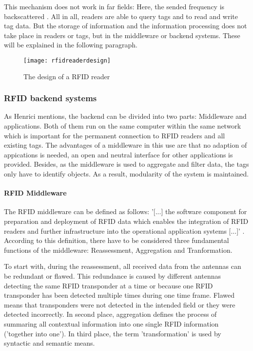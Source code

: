 This mechanism does not work in far fields: Here, the sended frequency is backscattered \cite{henrici}.
All in all, readers are able to query tags and to read and write tag data. But the storage of information and the information processing does not take place in readers or tags, but in the middleware or backend systems. These will be explained in the following paragraph.

\begin{figure}
\centering
\texttt{[image: rfidreaderdesign]} 
\caption{\label{fig:readerdesign}The design of a RFID reader \cite[p.17]{chipless}} 
\end{figure}

\subsubsection{RFID backend systems} \label{backend}

As Henrici \cite{henrici} mentions, the backend can be divided into two parts: Middleware and applications. Both of them run on the same computer within the same network which is important for the permanent connection to RFID readers and all existing tags. The advantages of a middleware in this use are that no adaption of appications is needed, an open and neutral interface for other applications is provided. Besides, as the middleware is used to aggregate and filter data, the tags only have to identify objects. As a result, modularity of the system is maintained.

\paragraph{RFID Middleware}

The RFID middleware can be defined as follows: '[...] the software component for preparation and deployment of RFID data which enables the integration of RFID readers and further infrastructure into the operational application systems [...]' \cite[p.20 ff.]{fokus}. According to this definition, there have to be considered three fundamental functions of the middleware: Reassessment, Aggregation and Tranformation. 

To start with, during the reassessment, all received data from the antennas can be redundant or flawed. This redundance is caused by different antennas detecting the same RFID transponder at a time or because one RFID transponder has been detected multiple times during one time frame. Flawed means that transponders were not detected in the intended field or they were detected incorrectly. In second place, aggregation defines the process of summaring all contextual information into one single RFID information ('together into one'). In third place, the term 'transformation' is used by syntactic and semantic means. 

